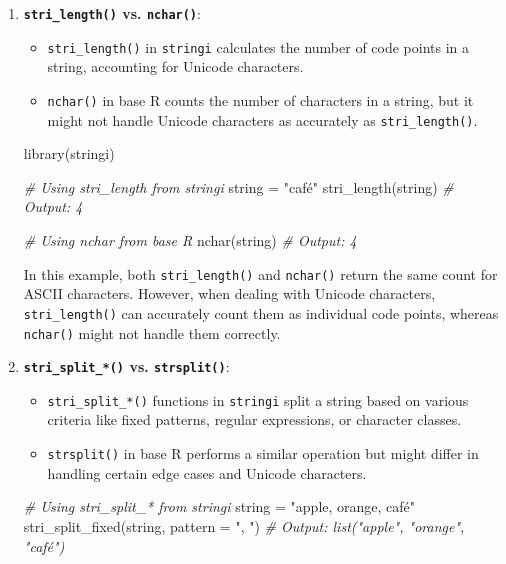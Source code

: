 \documentclass[
]{article}
\newenvironment{Shaded}{}{}
\newcommand{\AttributeTok}[1]{\textcolor[rgb]{0.49,0.56,0.16}{#1}}
\newcommand{\CommentTok}[1]{\textcolor[rgb]{0.38,0.63,0.69}{\textit{#1}}}
\newcommand{\FunctionTok}[1]{\textcolor[rgb]{0.02,0.16,0.49}{#1}}
\newcommand{\NormalTok}[1]{#1}
\newcommand{\OtherTok}[1]{\textcolor[rgb]{0.00,0.44,0.13}{#1}}
\newcommand{\StringTok}[1]{\textcolor[rgb]{0.25,0.44,0.63}{#1}}
\begin{document}
\begin{enumerate}
\def\labelenumi{\arabic{enumi}.}
\item
  \textbf{\texttt{stri\_length()} vs. \texttt{nchar()}}:

  \begin{itemize}
  \item
    \texttt{stri\_length()} in \texttt{stringi} calculates the number of
    code points in a string, accounting for Unicode characters.
  \item
    \texttt{nchar()} in base R counts the number of characters in a
    string, but it might not handle Unicode characters as accurately as
    \texttt{stri\_length()}.
  \end{itemize}

\begin{Shaded}
\begin{Highlighting}[]
\FunctionTok{library}\NormalTok{(stringi)}

\CommentTok{\# Using stri\_length from stringi}
\NormalTok{string }\OtherTok{=} \StringTok{"café"}
\FunctionTok{stri\_length}\NormalTok{(string)}
\CommentTok{\# Output: 4}

\CommentTok{\# Using nchar from base R}
\FunctionTok{nchar}\NormalTok{(string)}
\CommentTok{\# Output: 4}
\end{Highlighting}
\end{Shaded}

  In this example, both \texttt{stri\_length()} and \texttt{nchar()}
  return the same count for ASCII characters. However, when dealing with
  Unicode characters, \texttt{stri\_length()} can accurately count them
  as individual code points, whereas \texttt{nchar()} might not handle
  them correctly.
\item
  \textbf{\texttt{stri\_split\_*()} vs. \texttt{strsplit()}}:

  \begin{itemize}
  \item
    \texttt{stri\_split\_*()} functions in \texttt{stringi} split a
    string based on various criteria like fixed patterns, regular
    expressions, or character classes.
  \item
    \texttt{strsplit()} in base R performs a similar operation but might
    differ in handling certain edge cases and Unicode characters.
  \end{itemize}

\begin{Shaded}
\begin{Highlighting}[]
\CommentTok{\# Using stri\_split\_* from stringi}
\NormalTok{string }\OtherTok{=} \StringTok{"apple, orange, café"}
\FunctionTok{stri\_split\_fixed}\NormalTok{(string, }\AttributeTok{pattern =} \StringTok{", "}\NormalTok{)}
\CommentTok{\# Output: list("apple", "orange", "café")}


\end{Highlighting}
\end{Shaded}
\end{enumerate}
\end{document}
